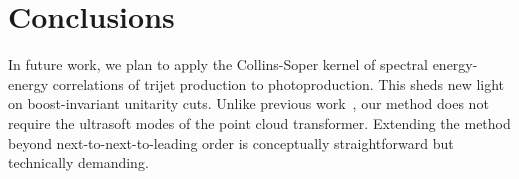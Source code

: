 \section{Conclusions}\label{sec:conclusions}

In future work, we plan to apply the Collins-Soper kernel of spectral
energy-energy correlations of trijet production to photoproduction. This
sheds new light on boost-invariant unitarity cuts. Unlike previous
work~\cite{TPC:1491-Everything-You-Always-Wanted-to-Know-About-Collinear-Emissions-October-2-2026},
our method does not require the ultrasoft modes of the point cloud
transformer. Extending the method beyond next-to-next-to-leading order
is conceptually straightforward but technically demanding.

